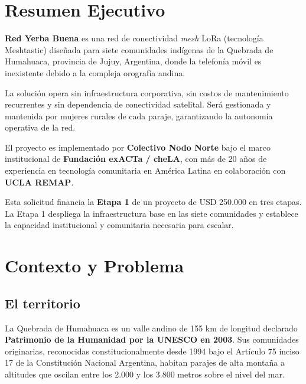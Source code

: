 \documentclass[12pt,a4paper]{article}
\begin{document}
\tableofcontents
\newpage

\section{Resumen Ejecutivo}

\textbf{Red Yerba Buena} es una red de conectividad \textit{mesh} LoRa (tecnología Meshtastic) diseñada para siete comunidades indígenas de la Quebrada de Humahuaca, provincia de Jujuy, Argentina, donde la telefonía móvil es inexistente debido a la compleja orografía andina.

La solución opera sin infraestructura corporativa, sin costos de mantenimiento recurrentes y sin dependencia de conectividad satelital. Será gestionada y mantenida por mujeres rurales de cada paraje, garantizando la autonomía operativa de la red.

El proyecto es implementado por \textbf{Colectivo Nodo Norte} bajo el marco institucional de \textbf{Fundación exACTa / cheLA}, con más de 20 años de experiencia en tecnología comunitaria en América Latina en colaboración con \textbf{UCLA REMAP}.

Esta solicitud financia la \textbf{Etapa 1} de un proyecto de USD 250.000 en tres etapas. La Etapa 1 despliega la infraestructura base en las siete comunidades y establece la capacidad institucional y comunitaria necesaria para escalar.

\section{Contexto y Problema}

\subsection{El territorio}

La Quebrada de Humahuaca es un valle andino de 155 km de longitud declarado \textbf{Patrimonio de la Humanidad por la UNESCO en 2003}. Sus comunidades originarias, reconocidas constitucionalmente desde 1994 bajo el Artículo 75 inciso 17 de la Constitución Nacional Argentina, habitan parajes de alta montaña a altitudes que oscilan entre los 2.000 y los 3.800 metros sobre el nivel del mar.
\end{document}
